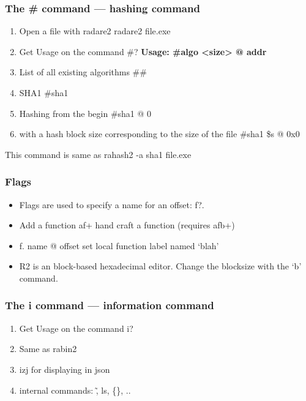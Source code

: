 \documentclass[10pt,pdf,utf8,english,compress,hyperref={unicode}]{beamer}
\begin{document}
\begin{frame}[fragile]
  \frametitle{The \# command — hashing command}
  \begin{enumerate}
  \item Open a file with radare2 \alert{radare2 file.exe}
  \item Get Usage on the command \alert{\#?} \textbf{Usage: \#algo <size> @ addr}
  \item List of all existing algorithms \alert{\#\#}
  \item SHA1 \alert{\#sha1}
  \item Hashing from the begin \alert{\#sha1 @ 0}
  \item with a hash block size corresponding to the size of the file \alert{\#sha1 \$s @ 0x0}
 \end{enumerate}
This command is same as rahash2 -a sha1 file.exe
\end{frame}

\begin{frame}[fragile]
  \frametitle{Flags}
  \begin{itemize}
  \item Flags are used to specify a name for an offset: \alert{f?}.
  \item Add a function af+ hand craft a function (requires afb+)
	\item f. name @ offset set local function label named `blah'
 \end{itemize}
 \noindent\makebox[\linewidth]{\rule{\paperwidth}{0.4pt}}
 \begin{itemize}
 \item R2 is an block-based hexadecimal editor. Change the blocksize with the ‘b’ command.
\end{itemize}
\end{frame}

\begin{frame}[fragile]
  \frametitle{The i command — information command}
  \begin{enumerate}
  \item Get Usage on the command \alert{i?}
  \item Same as \alert{rabin2}
  \item izj for displaying in json
  \item internal commands: \~, ls, \{\}, ..
 \end{enumerate}
\end{frame}

\end{document}
